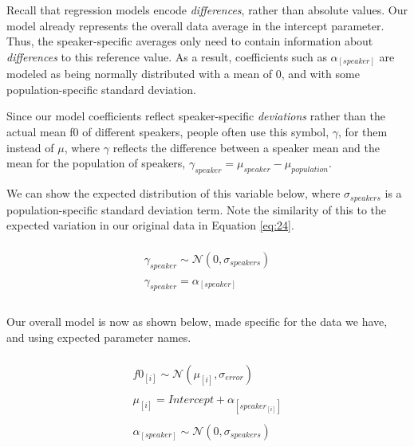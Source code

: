 \documentclass[
]{book}
\begin{document}
Recall that regression models encode \emph{differences}, rather than absolute values. Our model already represents the overall data average in the intercept parameter. Thus, the speaker-specific averages only need to contain information about \emph{differences} to this reference value. As a result, coefficients such as \(\alpha_{[speaker]}\) are modeled as being normally distributed with a mean of 0, and with some population-specific standard deviation.

Since our model coefficients reflect speaker-specific \emph{deviations} rather than the actual mean f0 of different speakers, people often use this symbol, \(\gamma\), for them instead of \(\mu\), where \(\gamma\) reflects the difference between a speaker mean and the mean for the population of speakers, \(\gamma_{speaker} = \mu_{speaker} - \mu_{population}\).

We can show the expected distribution of this variable below, where \(\sigma_{speakers}\) is a population-specific standard deviation term. Note the similarity of this to the expected variation in our original data in Equation \eqref{eq:24}.

\begin{equation}
\begin{split}
\\
\gamma_{speaker} \sim \mathcal{N}(0,\sigma_{speakers}) \\ \\ 
\gamma_{speaker} = \alpha_{[speaker]} \\ \\
\end{split}
\label{eq:27}
\end{equation}

Our overall model is now as shown below, made specific for the data we have, and using expected parameter names.

\begin{equation}
\begin{split}
\\
f0_{[i]} \sim \mathcal{N}(\mu_{[i]},\sigma_{error}) \\ \\
\mu_{[i]} = Intercept + \alpha_{[speaker_{[i]}]} \\ \\
\alpha_{[speaker]} \sim \mathcal{N}(0,\sigma_{speakers}) \\ \\
\end{split}
\label{eq:28}
\end{equation}
\end{document}
